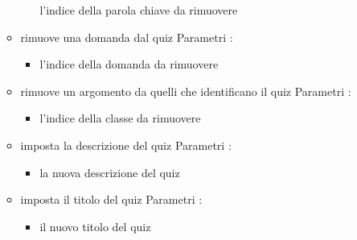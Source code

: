 \begin{itemize}
\begin{itemize}
\begin{itemize}
\newline
l'indice della parola chiave da rimuovere
\end{itemize}
\item {}
\newline
rimuove una domanda dal quiz
\newline
Parametri :
\begin{itemize}
\item {}
\newline
l'indice della domanda da rimuovere
\end{itemize}
\item {}
\newline
rimuove un argomento da quelli che identificano il quiz
\newline
Parametri :
\begin{itemize}
\item {}
\newline
l'indice della classe da rimuovere
\end{itemize}
\item {}
\newline
imposta la descrizione del quiz
\newline
Parametri :
\begin{itemize}
\item {}
\newline
la nuova descrizione del quiz
\end{itemize}
\item {}
\newline
imposta il titolo del quiz
\newline
Parametri :
\begin{itemize}
\item {}
\newline
il nuovo titolo del quiz
\end{itemize}
\end{itemize}
\end{itemize}

